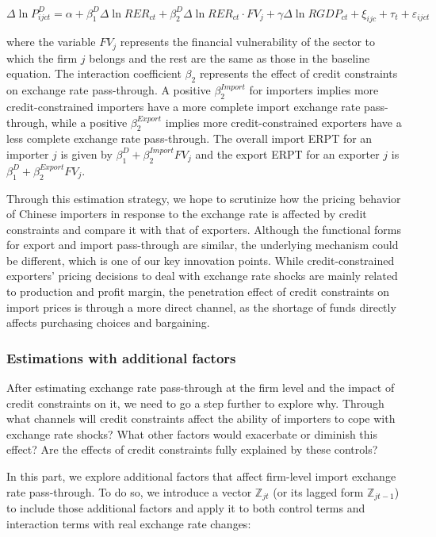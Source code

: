 \documentclass[12pt]{article}
\begin{document}
\begin{equation}
	\Delta \ln P^{D}_{ijct}=\alpha+\beta^D_{1} \Delta \ln RER_{ct}+\beta^D_{2} \Delta \ln RER_{ct} \cdot FV_{j}+\gamma \Delta \ln RGDP_{ct}+\xi_{ijc}+\tau_{t} +\varepsilon_{ijct}
	\label{eq.credit}
\end{equation}

where the variable $FV_{j}$ represents the financial vulnerability of the sector to which the firm $j$ belongs and the rest are the same as those in the baseline equation. The interaction coefficient $\beta_2$ represents the effect of credit constraints on exchange rate pass-through. A positive $\beta^{Import}_2$ for importers implies more credit-constrained importers have a more complete import exchange rate pass-through, while a positive $\beta^{Export}_2$ implies more credit-constrained exporters have a less complete exchange rate pass-through. The overall import ERPT for an importer $j$ is given by $\beta^D_{1} +\beta^{Import}_{2} FV_j$ and the export ERPT for an exporter $j$ is  $\beta^D_{1} +\beta^{Export}_{2} FV_j$.

Through this estimation strategy, we hope to scrutinize how the pricing behavior of Chinese importers in response to the exchange rate is affected by credit constraints and compare it with that of exporters. Although the functional forms for export and import pass-through are similar, the underlying mechanism could be different, which is one of our key innovation points. While credit-constrained exporters’ pricing decisions to deal with exchange rate shocks are mainly related to production and profit margin, the penetration effect of credit constraints on import prices is through a more direct channel, as the shortage of funds directly affects purchasing choices and bargaining.

\subsubsection{Estimations with additional factors}

After estimating exchange rate pass-through at the firm level and the impact of credit constraints on it, we need to go a step further to explore why. Through what channels will credit constraints affect the ability of importers to cope with exchange rate shocks? What other factors would exacerbate or diminish this effect? Are the effects of credit constraints fully explained by these controls?

In this part, we explore additional factors that affect firm-level import exchange rate pass-through. To do so, we introduce a vector $\mathbb{Z}_{jt}$ (or its lagged form $\mathbb{Z}_{jt-1}$) to include those additional factors and apply it to both control terms and interaction terms with real exchange rate changes: 
\end{document}
